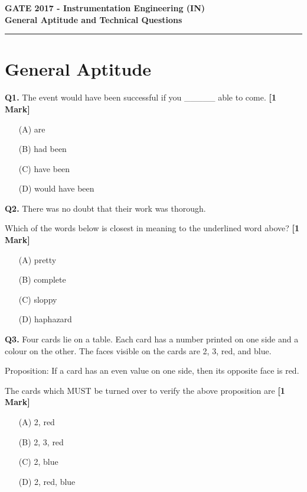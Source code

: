 \documentclass[11pt]{article}
\newcommand{\questiona}[2]{
    \noindent\textbf{Q#2.} #1 \hfill \textbf{[1 Mark]}
}
\begin{document}
\begin{center}
    \Large\textbf{GATE 2017 - Instrumentation Engineering (IN)} \\
    \large\textbf{General Aptitude and Technical Questions} \\
    \rule{\textwidth}{0.5pt} %
\end{center}

\vspace{0.5cm}

\section*{General Aptitude}

\questiona{The event would have been successful if you \_\_\_\_\_ able to come.}{1}
\begin{enumerate}
    \item[(A)] are  
    \item[(B)] had been  
    \item[(C)] have been  
    \item[(D)] would have been  
\end{enumerate}
\vspace{0.5cm}

\questiona{There was no doubt that their work was thorough.

Which of the words below is closest in meaning to the underlined word above?}{2}
\begin{enumerate}
    \item[(A)] pretty  
    \item[(B)] complete  
    \item[(C)] sloppy  
    \item[(D)] haphazard  
\end{enumerate}
\vspace{0.5cm}

\questiona{Four cards lie on a table. Each card has a number printed on one side and a colour on the other. The faces visible on the cards are 2, 3, red, and blue.

Proposition: If a card has an even value on one side, then its opposite face is red.

The cards which MUST be turned over to verify the above proposition are}{3}
\begin{enumerate}
    \item[(A)] 2, red  
    \item[(B)] 2, 3, red  
    \item[(C)] 2, blue  
    \item[(D)] 2, red, blue  
\end{enumerate}
\vspace{0.5cm}
\end{document}
